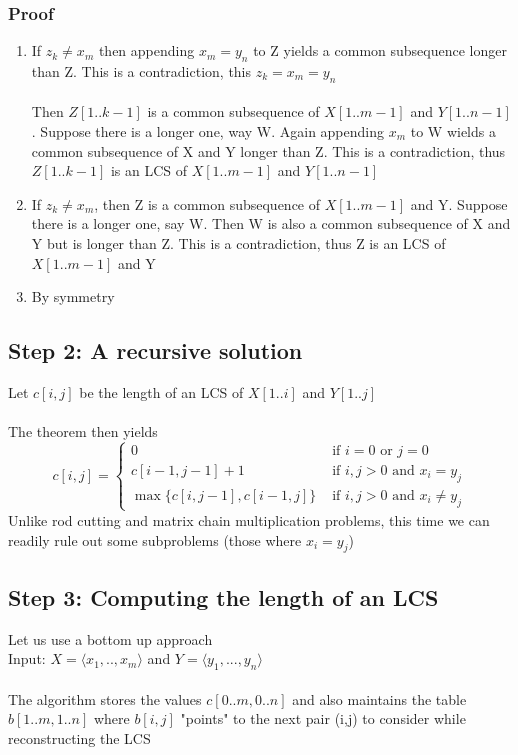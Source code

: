 \documentclass{article}[18pt]
\begin{document}
\subsubsection{Proof}
\begin{enumerate}
	\item If $z_k\neq x_m$ then appending $x_m=y_n$ to Z yields a common subsequence longer than Z. This is a contradiction, this $z_k=x_m=y_n$\\
	\\
	Then $Z[1..k-1]$ is a common subsequence of $X[1..m-1]$ and $Y[1..n-1]$. Suppose there is a longer one, way W. Again appending $x_m$ to W wields a common subsequence of X and Y longer than Z. This is a contradiction, thus $Z[1..k-1]$ is an LCS of $X[1..m-1]$ and $Y[1..n-1]$
	\item If $z_k\neq x_m$, then Z is a common subsequence of $X[1..m-1]$ and Y. Suppose there is a longer one, say W. Then W is also a common subsequence of X and Y but is longer than Z. This is a contradiction, thus Z is an LCS of $X[1..m-1]$ and Y
	\item By symmetry
\end{enumerate}
\subsection{Step 2: A recursive solution}
Let $c[i,j]$ be the length of an LCS of $X[1..i]$ and $Y[1..j]$\\
\\
The theorem then yields
\[
c[i, j]=\left\{\begin{array}{ll}{0} & {\text { if } i=0 \text { or } j=0} \\ {c[i-1, j-1]+1} & {\text { if } i, j>0 \text { and } x_{i}=y_{j}} \\ {\max \{c[i, j-1], c[i-1, j]\}} & {\text { if } i, j>0 \text { and } x_{i} \neq y_{j}}\end{array}\right.
\]
Unlike rod cutting and matrix chain multiplication problems, this time we can readily rule out some subproblems (those where $x_i=y_j$)
\subsection{Step 3: Computing the length of an LCS}
Let us use a bottom up approach\\
Input: $X=\langle x_1,..,x_m \rangle$ and $Y=\langle y_1,...,y_n \rangle$\\
\\
The algorithm stores the values $c[0..m,0..n]$ and also maintains the table $b[1..m,1..n]$ where $b[i,j]$ "points" to the next pair (i,j) to consider while reconstructing the LCS
\end{document}
